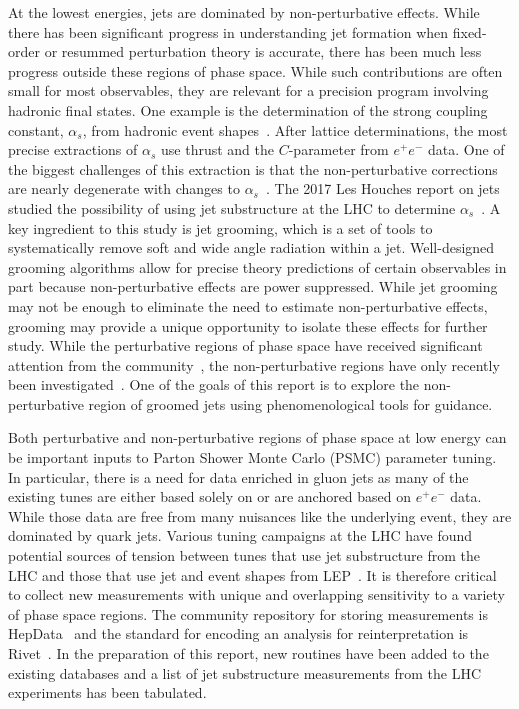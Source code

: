\documentclass[11pt]{cernrep}
\begin{document}
At the lowest energies, jets are dominated by non-perturbative effects.  While there has been significant progress in understanding jet formation when fixed-order or resummed perturbation theory is accurate, there has been much less progress outside these regions of phase space.  While such contributions are often small for most observables, they are relevant for a precision program involving hadronic final states.  One example is the determination of the strong coupling constant, $\alpha_s$, from hadronic event shapes~\cite{Abbate:2010xh,Hoang:2015hka,TheALEPHCollaboration2004,DELPHICollaboration1997,Abdallah:2004xe,Biebel:1999zt,Abbiendi:2004qz,Buskulic:1992hq}.   After lattice determinations, the most precise extractions of $\alpha_s$ use thrust and the $C$-parameter from $e^+e^-$ data.  One of the biggest challenges of this extraction is that the non-perturbative corrections are nearly degenerate with changes to $\alpha_s$~\cite{Abbate:2010xh}.  The 2017 Les Houches report on jets studied the possibility of using jet substructure at the LHC to determine $\alpha_s$~\cite{Bendavid:2018nar}.  A key ingredient to this study is jet grooming, which is a set of tools to systematically remove soft and wide angle radiation within a jet.  Well-designed grooming algorithms allow for precise theory predictions of certain observables in part because non-perturbative effects are power suppressed.  While jet grooming may not be enough to eliminate the need to estimate non-perturbative effects, grooming may provide a unique opportunity to isolate these effects for further study.   While the perturbative regions of phase space have received significant attention from the community~\cite{Frye:2016aiz,Frye:2016okc,Marzani:2017mva,Marzani:2017kqd,Kang:2018vgn,Kang:2018jwa,Baron:2018nfz,Kardos:2018kth}, the non-perturbative regions have only recently been investigated~\cite{Hoang:2019ceu}.   One of the goals of this report is to explore the non-perturbative region of groomed jets using phenomenological tools for guidance. 

Both perturbative and non-perturbative regions of phase space at low energy can be important inputs to Parton Shower Monte Carlo (PSMC) parameter tuning.  In particular, there is a need for data enriched in gluon jets as many of the existing tunes are either based solely on or are anchored based on $e^+e^-$ data.  While those data are free from many nuisances like the underlying event, they are dominated by quark jets.  Various tuning campaigns at the LHC have found potential sources of tension between tunes that use jet substructure from the LHC and those that use jet and event shapes from LEP~\cite{ATL-PHYS-PUB-2014-021,Aad:2016oit}.  It is therefore critical to collect new measurements with unique and overlapping sensitivity to a variety of phase space regions.  The community repository for storing measurements is HepData~\cite{Buckley:2010jn,Maguire:2017ypu} and the standard for encoding an analysis for reinterpretation is Rivet~\cite{Buckley:2010ar}.  In the preparation of this report, new routines have been added to the existing databases and a list of jet substructure measurements from the LHC experiments has been tabulated.
\end{document}
